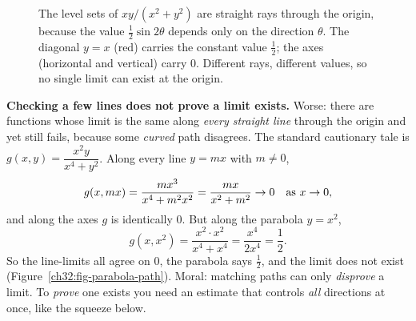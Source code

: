 \begin{figure}[H]
\centering
{}
\caption{The level sets of $xy/(x^2+y^2)$ are straight rays through the origin, because the
value $\tfrac12\sin 2\theta$ depends only on the direction $\theta$. The diagonal $y=x$ (red)
carries the constant value $\tfrac12$; the axes (horizontal and vertical) carry $0$. Different
rays, different values, so no single limit can exist at the origin.}
\label{ch32:fig-twopath-contour}
\end{figure}

\begin{trapbox}
\textbf{Checking a few lines does not prove a limit exists.} Worse: there are functions whose
limit is the same along \emph{every straight line} through the origin and yet still fails,
because some \emph{curved} path disagrees. The standard cautionary tale is
$g(x,y)=\dfrac{x^2 y}{x^4+y^2}$. Along every line $y=mx$ with $m\ne 0$,
\[
   g(x,mx) = \frac{m x^3}{x^4 + m^2x^2} = \frac{m x}{x^2 + m^2} \to 0
   \quad\text{as } x\to 0,
\]
and along the axes $g$ is identically $0$. But along the parabola $y=x^2$,
\[
   g(x,x^2) = \frac{x^2\cdot x^2}{x^4 + x^4} = \frac{x^4}{2x^4} = \frac12 .
\]
So the line-limits all agree on $0$, the parabola says $\tfrac12$, and the limit does not
exist (Figure~\ref{ch32:fig-parabola-path}). Moral: matching paths can only \emph{disprove} a
limit. To \emph{prove} one exists you need an estimate that controls \emph{all} directions at
once, like the squeeze below.
\end{trapbox}

